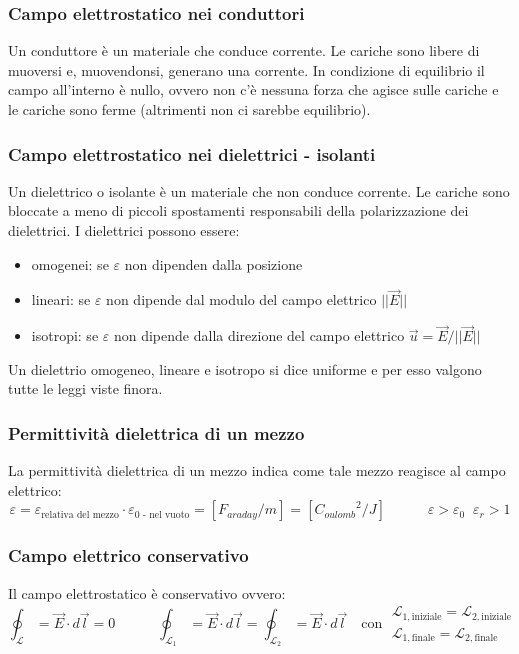 \documentclass[a4paper]{article}
\begin{document}
\subsubsection*{Campo elettrostatico nei conduttori}
Un conduttore è un materiale che conduce corrente. Le cariche sono libere di muoversi e, muovendonsi, generano una corrente. In
condizione di equilibrio il campo all'interno è nullo, ovvero non c'è nessuna forza che agisce sulle cariche e le cariche sono
ferme (altrimenti non ci sarebbe equilibrio).

\subsubsection*{Campo elettrostatico nei dielettrici - isolanti}
Un dielettrico o isolante è un materiale che non conduce corrente. Le cariche sono bloccate a meno di piccoli spostamenti responsabili
della polarizzazione dei dielettrici. I dielettrici possono essere:
\begin{itemize}
	\item omogenei: se \(\varepsilon\) non dipenden dalla posizione
	\item lineari: se \(\varepsilon\) non dipende dal modulo del campo elettrico \(||\vec{E}||\)
	\item isotropi: se \(\varepsilon\) non dipende dalla direzione del campo elettrico \(\vec{u} = \vec{E} \big/ ||{\vec{E}}||\)
\end{itemize}
Un dielettrio omogeneo, lineare e isotropo si dice uniforme e per esso valgono tutte le leggi viste finora.

\subsubsection*{Permittività dielettrica di un mezzo}
La permittività dielettrica di un mezzo indica come tale mezzo reagisce al campo elettrico:
\[\varepsilon = \varepsilon_\text{relativa del mezzo} \cdot \varepsilon_\text{0 - nel vuoto} = [F_{araday}/m] = [{C_{oulomb}}^2/J] \qquad \quad \varepsilon > \varepsilon_0 \;\; \varepsilon_r > 1\]

\subsubsection*{Campo elettrico conservativo}
Il campo elettrostatico è conservativo ovvero:
\[\oint_\mathcal{L} = \vec{E} \cdot d\vec{l} = 0 \qquad \quad \oint_{\mathcal{L}_1} = \vec{E} \cdot d\vec{l} = \oint_{\mathcal{L}_2} = \vec{E} \cdot d\vec{l} \quad
\text{con} \; \begin{matrix} \mathcal{L}_{1,\text{iniziale}} = \mathcal{L}_{2,\text{iniziale}} \\ \mathcal{L}_{1,\text{finale}} = \mathcal{L}_{2,\text{finale}} \end{matrix}\]
\end{document}
